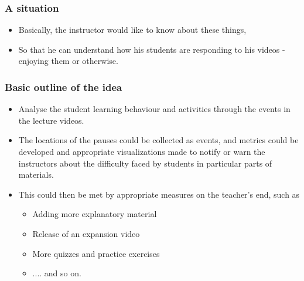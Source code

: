 \documentclass[12pt,xcolor=dvipsnames]{beamer}
\begin{document}
\begin{frame}[t]
\frametitle{A situation}

\begin{itemize}
\vspace{70pt}
\item Basically, the instructor would like to know about these things,
\item So that he can understand how his students are responding to his videos - enjoying them or otherwise.
\end{itemize}

\end{frame}


\begin{frame}[t]
\frametitle{Basic outline of the idea}

\begin{itemize}
\item Analyse the student learning behaviour and activities through the events in the lecture videos.
\item The locations of the pauses could be collected as events, and metrics could be developed and appropriate visualizations made to notify or warn the instructors about the difficulty faced by students in particular parts of materials.
\item This could then be met by appropriate measures on the teacher's end, such as

\begin{itemize}
\item Adding more explanatory material
\item Release of an expansion video
\item More quizzes and practice exercises
\item .... and so on.
\end{itemize}

\end{itemize}
\end{frame}


\end{document}
